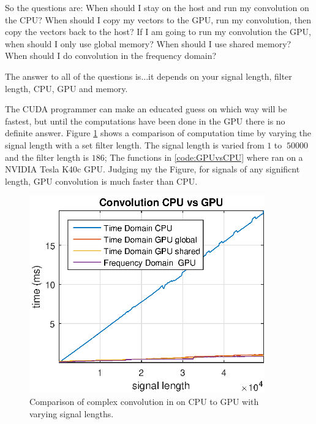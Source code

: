 So the questions are:
When should I stay on the host and run my convolution on the CPU?
When should I copy my vectors to the GPU, run my convolution, then copy the vectors back to the host?
If I am going to run my convolution the GPU, when should I only use global memory?
When should I use shared memory?
When should I do convolution in the frequency domain?

The answer to all of the questions is...it depends on your signal length, filter length, CPU, GPU and memory.

The CUDA programmer can make an educated guess on which way will be fastest, but until the computations have been done in the GPU there is no definite answer.
Figure \ref{fig:CPUvsGPU} shows a comparison of computation time by varying the signal length with a set filter length.
The signal length is varied from $1$ to $~50000$ and the filter length is $186$;
The functions in \ref{code:GPUvsCPU} where ran on a NVIDIA Tesla K40c GPU.
Judging my the Figure, for signals of any significnt length, GPU convolution is much faster than CPU.
\begin{figure}
	\centering\includegraphics[width=4in]{figures/gpu_intro/CPUvsGPU.eps}
	\caption{Comparison of complex convolution in on CPU to GPU with varying signal lengths.}
	\label{fig:CPUvsGPU}
\end{figure}

